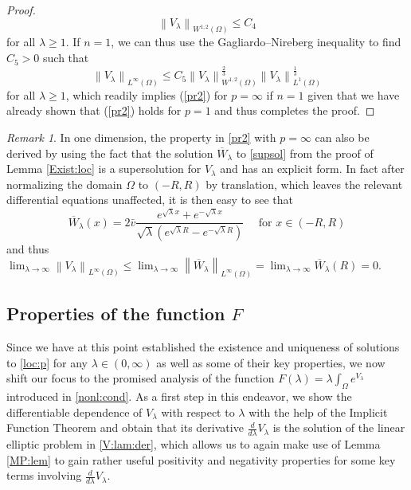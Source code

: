 \documentclass[12pt,a4paper]{amsart}
\theoremstyle{definition}
\theoremstyle{remark}
\newtheorem{remark}[theorem]{Remark}
\numberwithin{equation}{section}
\numberwithin{theorem}{section}
\newcommand{\normA}[2][]{\left\lVert #2 \right\rVert_{#1}}
\begin{document}
\begin{proof}
$$
  \normA[W^{1,2}(\Omega)]{V_\lambda} \leq C_4
$$
for all $\lambda \geq 1$. If $n = 1$, we can thus use the Gagliardo--Nireberg inequality to find $C_5 > 0$ such that  
$$
  \normA[L^\infty(\Omega)]{V_\lambda} \leq C_5 \normA[W^{1,2}(\Omega)]{V_\lambda}^\frac{2}{3}\normA[L^1(\Omega)]{V_\lambda}^\frac{1}{3}
$$
for all $\lambda \geq 1$, which readily implies (\ref{pr2}) for $p = \infty$  if $n = 1$ given that we have already shown that (\ref{pr2}) holds for $p =1 $ and thus completes the proof.
\end{proof}
\begin{remark}
  In one dimension, the property in \eqref{pr2} with $p = \infty$ can also be derived by using the fact that the solution $\overline{W}_\lambda$ to \eqref{supsol} from the proof of Lemma \ref{Exist:loc} is a supersolution for $V_\lambda$ and has an explicit form. In fact after normalizing the domain $\Omega$ to $(-R,R)$ by translation, which leaves the relevant differential equations unaffected, it is then easy to see that
  $$
    \overline{W}_\lambda(x) = 2\bar{v}\frac{e^{\sqrt{\lambda}x} + e^{-\sqrt{\lambda}x}}{\sqrt{\lambda}(e^{\sqrt{\lambda}R} - e^{-\sqrt{\lambda}R})} \quad \text{ for } x \in (-R, R)
  $$
  and thus $\lim_{\lambda\rightarrow \infty}\normA[L^\infty(\Omega)]{V_\lambda} \leq \lim_{\lambda\rightarrow \infty}\normA[L^\infty(\Omega)]{\overline{W}_\lambda} = \lim_{\lambda\rightarrow \infty}\overline{W}_\lambda(R) = 0$.
\end{remark}

\subsection{Properties of the function $F$}


Since we have at this point established the existence and uniqueness of solutions to \eqref{loc:p} for any $\lambda\in(0,\infty)$ as well as some of their key properties, we now shift our focus to the promised analysis of the function $F(\lambda) = \lambda \int_\Omega e^{V_\lambda}$ introduced in \eqref{nonl:cond}. As a first step in this endeavor, we show the differentiable dependence of $V_\lambda$ with respect to $\lambda$ with the help of the Implicit Function Theorem and obtain that its derivative $\frac{d}{d \lambda}V_\lambda$ is the solution of the linear elliptic problem in \eqref{V:lam:der}, which allows us to again make use of Lemma \ref{MP:lem} to gain rather useful positivity and negativity properties for some key terms involving $\frac{d}{d \lambda}V_\lambda$.
\end{document}

